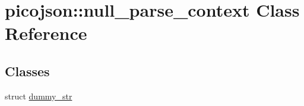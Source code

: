 \hypertarget{classpicojson_1_1null__parse__context}{\section{picojson\-:\-:null\-\_\-parse\-\_\-context Class Reference}
\label{classpicojson_1_1null__parse__context}
}
\subsection*{Classes}
\begin{DoxyCompactItemize}
\item 
struct \hyperlink{structpicojson_1_1null__parse__context_1_1dummy__str}{dummy\-\_\-str}
\end{DoxyCompactItemize}
